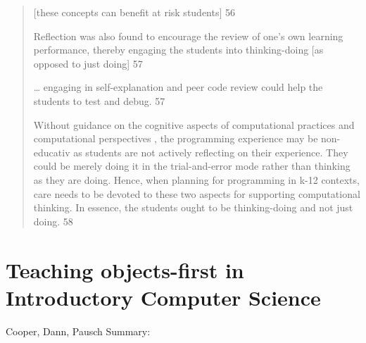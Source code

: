 \documentclass[12pt]{extarticle}
\begin{document}
\begin{quote}
    [these concepts can benefit at risk students] 56
    
    Reflection was also found to encourage the review of one’s own learning performance, thereby engaging the students into thinking-doing [as opposed to just doing] 57
    
    … engaging in self-explanation and peer code review could help the students to test and debug. 57
    
    Without guidance on the cognitive aspects of computational practices and computational perspectives , the programming experience may be non-educativ as students are not actively reflecting on their experience. They could be merely doing it in the trial-and-error mode rather than thinking as they are doing. Hence, when planning for programming in k-12 contexts, care needs to be devoted to these two aspects for supporting computational thinking. In essence, the students ought to be thinking-doing and not just doing. 58
\end{quote}

\section{Teaching objects-first in Introductory Computer Science}
Cooper, Dann, Pausch
Summary:
\end{document}
